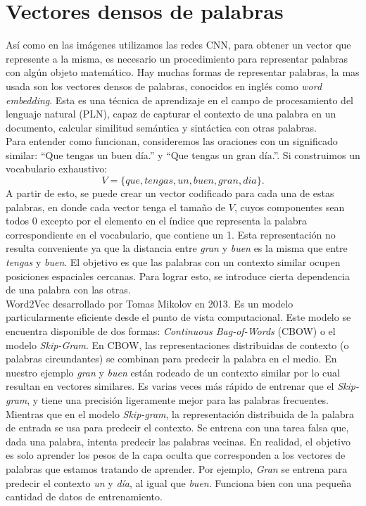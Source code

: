 \section{Vectores densos de palabras} \label{sec:vectoresdensosdepalabras}
Así como en las imágenes utilizamos las redes CNN, para obtener un vector que represente a la misma, es necesario un procedimiento para representar palabras con algún objeto matemático. Hay muchas formas de representar palabras, la mas usada son los vectores densos de palabras, conocidos en inglés como \textit{word embedding}. Esta es una técnica de aprendizaje en el campo de procesamiento del lenguaje natural (PLN), capaz de capturar el contexto de una palabra en un documento, calcular similitud semántica y sintáctica con otras palabras.\\

Para entender como funcionan, consideremos las oraciones con un significado similar: ``Que tengas un buen día.'' y ``Que tengas un gran día.''. Si construimos un vocabulario exhaustivo:
 \[ V = \{que, tengas, un, buen, gran, dia\}. \]
A partir de esto, se puede crear un vector codificado para cada una de estas palabras, en donde cada vector tenga el tamaño de $V$, cuyos componentes sean todos 0 excepto por el elemento en el índice que representa la palabra correspondiente en el vocabulario, que contiene un 1. Esta representación no resulta conveniente ya que la distancia entre \textit{gran} y \textit{buen} es la misma que entre \textit{tengas} y \textit{buen}.  El objetivo es que las palabras con un contexto similar ocupen posiciones espaciales cercanas. Para lograr esto, se introduce cierta dependencia de una palabra con las otras.\\

Word2Vec \cite{mikolov2013distributed} desarrollado por Tomas Mikolov en 2013. Es un modelo particularmente eficiente desde el punto de vista computacional. Este modelo se encuentra disponible de dos formas: \textit{Continuous Bag-of-Words} (CBOW) o el modelo \textit{Skip-Gram}. En CBOW, las representaciones distribuidas de contexto (o palabras circundantes) se combinan para predecir la palabra en el medio. En nuestro ejemplo \textit{gran} y \textit{buen} están rodeado de un contexto similar por lo cual resultan en vectores similares. Es varias veces más rápido de entrenar que el \textit{Skip-gram}, y tiene una precisión ligeramente mejor para las palabras frecuentes. Mientras que en el modelo \textit{Skip-gram}, la representación distribuida de la palabra de entrada se usa para predecir el contexto. Se entrena con una tarea falsa que, dada una palabra, intenta predecir las palabras vecinas. En realidad, el objetivo es solo aprender los pesos de la capa oculta que corresponden a los vectores de palabras que estamos tratando de aprender. Por ejemplo, \textit{Gran} se entrena para predecir el contexto \textit{un} y  \textit{día}, al igual que \textit{buen}. Funciona bien con una pequeña cantidad de datos de entrenamiento.

